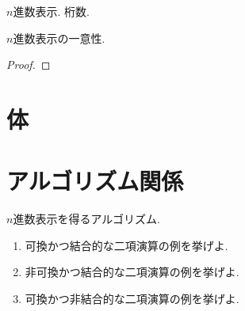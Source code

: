   \begin{definition}
    $n$進数表示.
    桁数.
  \end{definition}
  \begin{prop}
    $n$進数表示の一意性.
  \end{prop}
\begin{proof}\end{proof}
  \chapter{体}


  \chapter{アルゴリズム関係}
  $n$進数表示を得るアルゴリズム.
  
\begin{enumerate}
\item 可換かつ結合的な二項演算の例を挙げよ.
\item 非可換かつ結合的な二項演算の例を挙げよ.
\item 可換かつ非結合的な二項演算の例を挙げよ.
\end{enumerate}



    
